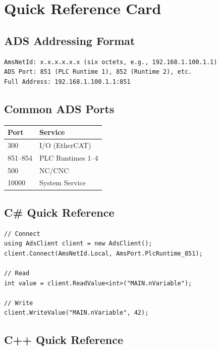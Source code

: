 \documentclass[11pt,a4paper]{article}
\begin{document}
\section*{Quick Reference Card}

\subsection*{ADS Addressing Format}

\begin{verbatim}
AmsNetId: x.x.x.x.x.x (six octets, e.g., 192.168.1.100.1.1)
ADS Port: 851 (PLC Runtime 1), 852 (Runtime 2), etc.
Full Address: 192.168.1.100.1.1:851
\end{verbatim}

\subsection*{Common ADS Ports}

\begin{table}[h]
\centering
\begin{tabular}{@{}ll@{}}
\toprule
\textbf{Port} & \textbf{Service} \\
\midrule
300 & I/O (EtherCAT) \\
851--854 & PLC Runtimes 1--4 \\
500 & NC/CNC \\
10000 & System Service \\
\bottomrule
\end{tabular}
\end{table}

\subsection*{C\# Quick Reference}

\begin{lstlisting}[style=csharpstyle]
// Connect
using AdsClient client = new AdsClient();
client.Connect(AmsNetId.Local, AmsPort.PlcRuntime_851);

// Read
int value = client.ReadValue<int>("MAIN.nVariable");

// Write
client.WriteValue("MAIN.nVariable", 42);
\end{lstlisting}

\subsection*{C++ Quick Reference}
\end{document}
